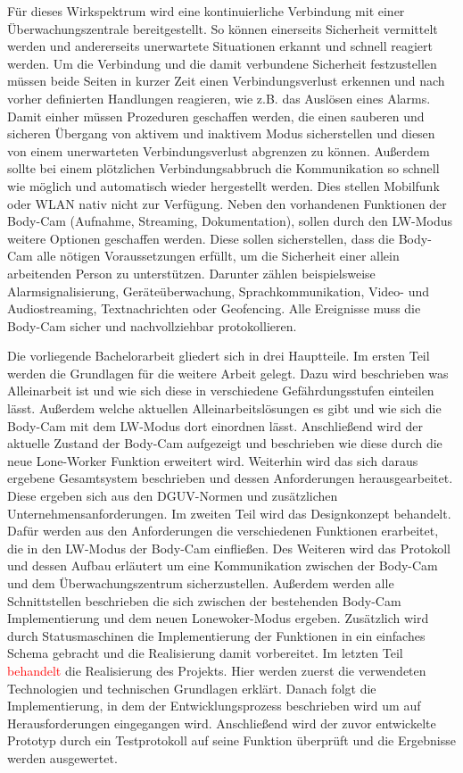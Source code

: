 \documentclass[thesis.tex]{subfiles}
\begin{document}
Für dieses Wirkspektrum wird eine kontinuierliche Verbindung mit einer Überwachungszentrale bereitgestellt.
So können einerseits Sicherheit vermittelt werden und andererseits unerwartete Situationen erkannt und schnell reagiert werden.
Um die Verbindung und die damit verbundene Sicherheit festzustellen müssen beide Seiten in kurzer Zeit einen Verbindungsverlust erkennen und nach vorher definierten Handlungen reagieren, wie z.B. das Auslösen eines Alarms.
Damit einher müssen Prozeduren geschaffen werden, die einen sauberen und sicheren Übergang von aktivem und inaktivem Modus sicherstellen und diesen von einem unerwarteten Verbindungsverlust abgrenzen zu können.
Außerdem sollte bei einem plötzlichen Verbindungsabbruch die Kommunikation so schnell wie möglich und automatisch wieder hergestellt werden.
Dies stellen Mobilfunk oder WLAN nativ nicht zur Verfügung.
Neben den vorhandenen Funktionen der Body-Cam (Aufnahme, Streaming, Dokumentation), sollen durch den LW-Modus weitere Optionen geschaffen werden.
Diese sollen sicherstellen, dass die Body-Cam alle nötigen Voraussetzungen erfüllt, um die Sicherheit einer allein arbeitenden Person zu unterstützen.
Darunter zählen beispielsweise Alarmsignalisierung, Geräteüberwachung, Sprachkommunikation, Video- und Audiostreaming, Textnachrichten oder Geofencing.
Alle Ereignisse muss die Body-Cam sicher und nachvollziehbar protokollieren.

Die vorliegende Bachelorarbeit gliedert sich in drei Hauptteile.
Im ersten Teil werden die Grundlagen für die weitere Arbeit gelegt.
Dazu wird beschrieben was Alleinarbeit ist und wie sich diese in verschiedene Gefährdungsstufen einteilen lässt.
Außerdem welche aktuellen Alleinarbeitslösungen es gibt und wie sich die Body-Cam mit dem LW-Modus dort einordnen lässt.
Anschließend wird der aktuelle Zustand der Body-Cam aufgezeigt und beschrieben wie diese durch die neue Lone-Worker Funktion erweitert wird.
Weiterhin wird das sich daraus ergebene Gesamtsystem beschrieben und dessen Anforderungen herausgearbeitet.
Diese ergeben sich aus den DGUV-Normen und zusätzlichen Unternehmensanforderungen.
Im zweiten Teil wird das Designkonzept behandelt.
Dafür werden aus den Anforderungen die verschiedenen Funktionen erarbeitet, die in den LW-Modus der Body-Cam einfließen.
Des Weiteren wird das Protokoll und dessen Aufbau erläutert um eine Kommunikation zwischen der Body-Cam und dem Überwachungszentrum sicherzustellen.
Außerdem werden alle Schnittstellen beschrieben die sich zwischen der bestehenden Body-Cam Implementierung und dem neuen Lonewoker-Modus ergeben.
Zusätzlich wird durch Statusmaschinen die Implementierung der Funktionen in ein einfaches Schema gebracht und die Realisierung damit vorbereitet.
Im letzten Teil \textcolor{red}{behandelt} die Realisierung des Projekts.
Hier werden zuerst die verwendeten Technologien und technischen Grundlagen erklärt.
Danach folgt die Implementierung, in dem der Entwicklungsprozess beschrieben wird um auf Herausforderungen eingegangen wird.
Anschließend wird der zuvor entwickelte Prototyp durch ein Testprotokoll auf seine Funktion überprüft und die Ergebnisse werden ausgewertet.
\end{document}
